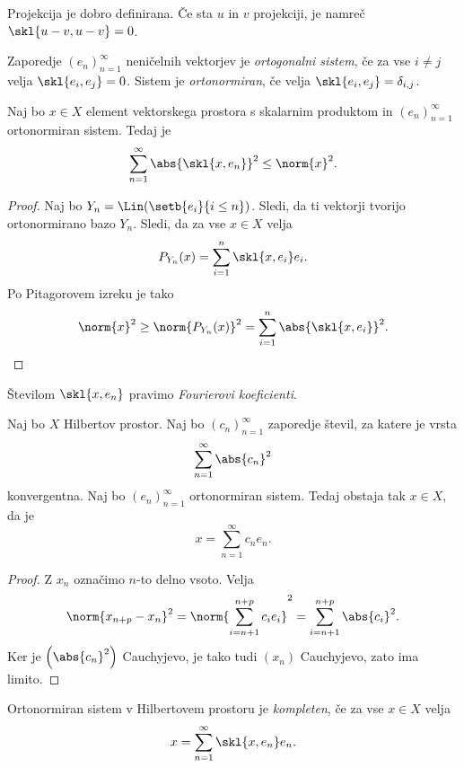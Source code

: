 \begin{opomba}
Projekcija je dobro definirana. Če sta $u$ in $v$ projekciji, je
namreč $\skl{u-v,u-v}=0$. 
\end{opomba}

\begin{definicija}
Zaporedje $(e_n)_{n=1}^\infty$ neničelnih vektorjev je
\emph{ortogonalni sistem},
če za vse $i \ne j$ velja
$\skl{e_i,e_j}=0$. Sistem je \emph{ortonormiran}, če velja
$\skl{e_i,e_j}=\delta_{i,j}$.
\end{definicija}

\begin{trditev}
Naj bo $x \in X$ element vektorskega prostora s skalarnim produktom
in $(e_n)_{n=1}^\infty$ ortonormiran sistem. Tedaj je
\[
\sum_{n=1}^\infty \abs{\skl{x,e_n}}^2 \leq \norm{x}^2.
\]
\end{trditev}

\begin{proof}
Naj bo $Y_n = \Lin(\setb{e_i}{i \leq n})$. Sledi, da ti vektorji
tvorijo ortonormirano bazo $Y_n$. Sledi, da za vse $x \in X$ velja
\[
P_{Y_n}(x) = \sum_{i=1}^n \skl{x,e_i} e_i.
\]
Po Pitagorovem izreku je tako
\[
\norm{x}^2 \geq
\norm{P_{Y_n}(x)}^2 =
\sum_{i=1}^n \abs{\skl{x,e_i}}^2. \qedhere
\]
\end{proof}

\begin{opomba}
Številom $\skl{x,e_n}$ pravimo
\emph{Fourierovi koeficienti}.
\end{opomba}

\begin{trditev}
Naj bo $X$ Hilbertov prostor. Naj bo $(c_n)_{n=1}^\infty$ zaporedje
števil, za katere je vrsta
\[
\sum_{n=1}^\infty \abs{c_n}^2
\]
konvergentna. Naj bo $(e_n)_{n=1}^\infty$ ortonormiran sistem.
Tedaj obstaja tak $x \in X$, da je
\[
x = \sum_{n=1}^\infty c_n e_n.
\]
\end{trditev}

\begin{proof}
Z $x_n$ označimo $n$-to delno vsoto. Velja
\[
\norm{x_{n+p} - x_n}^2 =
\norm{\sum_{i=n+1}^{n+p} c_ie_i}^2 =
\sum_{i=n+1}^{n+p} \abs{c_i}^2.
\]
Ker je $\left(\abs{c_n}^2\right)$ Cauchyjevo, je tako tudi $(x_n)$
Cauchyjevo, zato ima limito.
\end{proof}

\begin{definicija}
Ortonormiran sistem v Hilbertovem prostoru je
\emph{kompleten},
če za vse $x \in X$ velja
\[
x = \sum_{n=1}^\infty \skl{x,e_n}e_n.
\]
\end{definicija}

